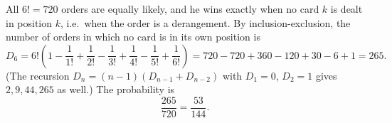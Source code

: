All $6!=720$ orders are equally likely, and he wins exactly when no card $k$ is dealt in position $k$, i.e.\ when the order is a derangement. By inclusion-exclusion, the number of orders in which no card is in its own position is
\[
D_6=6!\left(1-\dfrac{1}{1!}+\dfrac{1}{2!}-\dfrac{1}{3!}+\dfrac{1}{4!}-\dfrac{1}{5!}+\dfrac{1}{6!}\right)=720-720+360-120+30-6+1=265 .
\]
(The recursion $D_n=(n-1)(D_{n-1}+D_{n-2})$ with $D_1=0$, $D_2=1$ gives $2,9,44,265$ as well.) The probability is
\[
\dfrac{265}{720}=\boxed{\dfrac{53}{144}} .
\]
